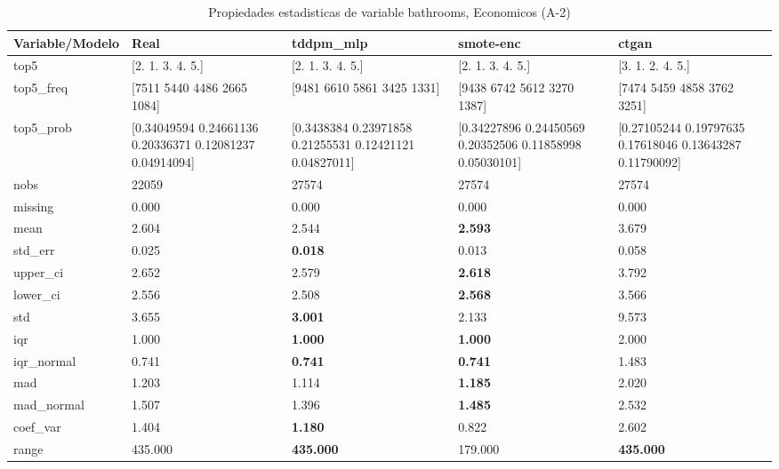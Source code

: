 \begin{table}[H]
\centering
\fontsize{8}{14}\selectfont
\caption{Propiedades  estadisticas de variable bathrooms, Economicos (A-2)}
\label{table-stats-economicos-a-2-bathrooms}
\begin{tabular}{|l|m{10em}|m{10em}|m{10em}|m{10em}|}
\hline
 \rowcolor[gray]{0.8}
Variable/Modelo & Real & tddpm\_mlp & smote-enc & ctgan \\
\hline top5 & [2. 1. 3. 4. 5.] & [2. 1. 3. 4. 5.] & [2. 1. 3. 4. 5.] & [3. 1. 2. 4. 5.] \\
\hline top5\_freq & [7511 5440 4486 2665 1084] & [9481 6610 5861 3425 1331] & [9438 6742 5612 3270 1387] & [7474 5459 4858 3762 3251] \\
\hline top5\_prob & [0.34049594 0.24661136 0.20336371 0.12081237 0.04914094] & [0.3438384  0.23971858 0.21255531 0.12421121 0.04827011] & [0.34227896 0.24450569 0.20352506 0.11858998 0.05030101] & [0.27105244 0.19797635 0.17618046 0.13643287 0.11790092] \\
\hline nobs & 22059 & 27574 & 27574 & 27574 \\
\hline missing & 0.000 & 0.000 & 0.000 & 0.000 \\
\hline mean & 2.604 & 2.544 & \bfseries 2.593 & \cellcolor[rgb]{0.9, 0.54, 0.52} 3.679 \\
\hline std\_err & 0.025 & \bfseries 0.018 & 0.013 & \cellcolor[rgb]{0.9, 0.54, 0.52} 0.058 \\
\hline upper\_ci & 2.652 & 2.579 & \bfseries 2.618 & \cellcolor[rgb]{0.9, 0.54, 0.52} 3.792 \\
\hline lower\_ci & 2.556 & 2.508 & \bfseries 2.568 & \cellcolor[rgb]{0.9, 0.54, 0.52} 3.566 \\
\hline std & 3.655 & \bfseries 3.001 & 2.133 & \cellcolor[rgb]{0.9, 0.54, 0.52} 9.573 \\
\hline iqr & 1.000 & \bfseries 1.000 & \bfseries 1.000 & \cellcolor[rgb]{0.9, 0.54, 0.52} 2.000 \\
\hline iqr\_normal & 0.741 & \bfseries 0.741 & \bfseries 0.741 & \cellcolor[rgb]{0.9, 0.54, 0.52} 1.483 \\
\hline mad & 1.203 & 1.114 & \bfseries 1.185 & \cellcolor[rgb]{0.9, 0.54, 0.52} 2.020 \\
\hline mad\_normal & 1.507 & 1.396 & \bfseries 1.485 & \cellcolor[rgb]{0.9, 0.54, 0.52} 2.532 \\
\hline coef\_var & 1.404 & \bfseries 1.180 & 0.822 & \cellcolor[rgb]{0.9, 0.54, 0.52} 2.602 \\
\hline range & 435.000 & \bfseries 435.000 & \cellcolor[rgb]{0.9, 0.54, 0.52} 179.000 & \bfseries 435.000 \\

\end{tabular}
\end{table}
